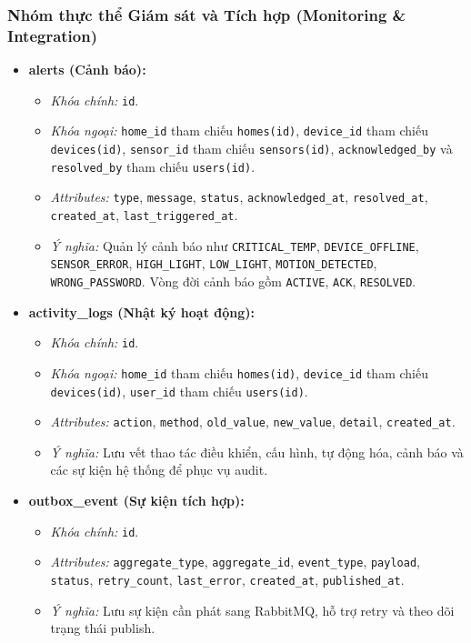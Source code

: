 \subsubsection{Nhóm thực thể Giám sát và Tích hợp (Monitoring \& Integration)}

\begin{itemize}
    \item \textbf{alerts (Cảnh báo):}
    \begin{itemize}
        \item \textit{Khóa chính:} \texttt{id}.
        \item \textit{Khóa ngoại:} \texttt{home\_id} tham chiếu \texttt{homes(id)}, \texttt{device\_id} tham chiếu \texttt{devices(id)}, \texttt{sensor\_id} tham chiếu \texttt{sensors(id)}, \texttt{acknowledged\_by} và \texttt{resolved\_by} tham chiếu \texttt{users(id)}.
        \item \textit{Attributes:} \texttt{type}, \texttt{message}, \texttt{status}, \texttt{acknowledged\_at}, \texttt{resolved\_at}, \texttt{created\_at}, \texttt{last\_triggered\_at}.
        \item \textit{Ý nghĩa:} Quản lý cảnh báo như \texttt{CRITICAL\_TEMP}, \texttt{DEVICE\_OFFLINE}, \texttt{SENSOR\_ERROR}, \texttt{HIGH\_LIGHT}, \texttt{LOW\_LIGHT}, \texttt{MOTION\_DETECTED}, \texttt{WRONG\_PASSWORD}. Vòng đời cảnh báo gồm \texttt{ACTIVE}, \texttt{ACK}, \texttt{RESOLVED}.
    \end{itemize}

    \item \textbf{activity\_logs (Nhật ký hoạt động):}
    \begin{itemize}
        \item \textit{Khóa chính:} \texttt{id}.
        \item \textit{Khóa ngoại:} \texttt{home\_id} tham chiếu \texttt{homes(id)}, \texttt{device\_id} tham chiếu \texttt{devices(id)}, \texttt{user\_id} tham chiếu \texttt{users(id)}.
        \item \textit{Attributes:} \texttt{action}, \texttt{method}, \texttt{old\_value}, \texttt{new\_value}, \texttt{detail}, \texttt{created\_at}.
        \item \textit{Ý nghĩa:} Lưu vết thao tác điều khiển, cấu hình, tự động hóa, cảnh báo và các sự kiện hệ thống để phục vụ audit.
    \end{itemize}

    \item \textbf{outbox\_event (Sự kiện tích hợp):}
    \begin{itemize}
        \item \textit{Khóa chính:} \texttt{id}.
        \item \textit{Attributes:} \texttt{aggregate\_type}, \texttt{aggregate\_id}, \texttt{event\_type}, \texttt{payload}, \texttt{status}, \texttt{retry\_count}, \texttt{last\_error}, \texttt{created\_at}, \texttt{published\_at}.
        \item \textit{Ý nghĩa:} Lưu sự kiện cần phát sang RabbitMQ, hỗ trợ retry và theo dõi trạng thái publish.
    \end{itemize}
\end{itemize}

